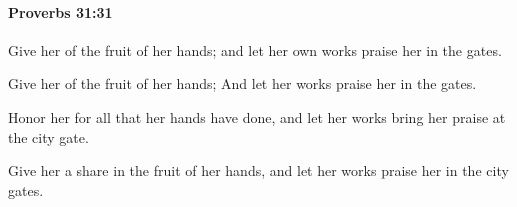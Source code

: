 		\paragraph{Proverbs 31:31} %
			\label{PROVERBS-31-31}

			Give her of the fruit of her hands; and let her own works praise her in the gates.

			\begin{versebox}
					\item[BHS] 
					\item[ASV] Give her of the fruit of her hands; And let her works praise her in the gates.
					\item[NIV] Honor her for all that her hands have done, and let her works bring her praise at the city gate.
					\item[NRSV] Give her a share in the fruit of her hands, and let her works praise her in the city gates.
			\end{versebox}
